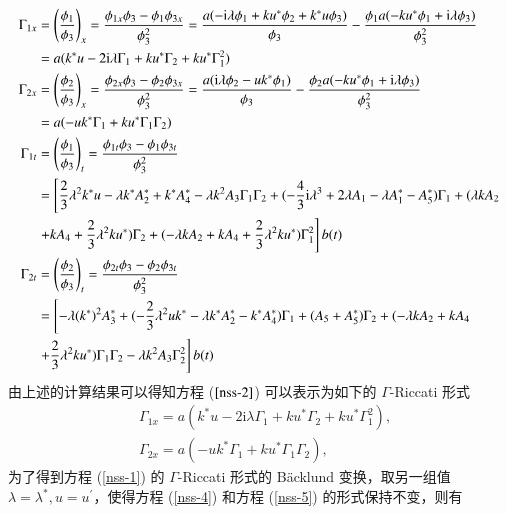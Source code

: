 \begin{align}
\Gamma_{1x} &= \left(\frac{\phi_1}{\phi_3}\right)_x=\frac{\phi_{1x}\phi_3-\phi_1\phi_{3x}}{\phi_3^2}=\frac{a(-\mathrm{i}\lambda\phi_1+ku^*\phi_2+k^*u\phi_3)}{\phi_3}-\frac{\phi_1a(-ku^*\phi_1+\mathrm{i}\lambda\phi_3)}{\phi_3^2} \nonumber\\
  &= a(k^{*}u - 2\mathrm{i}\lambda \Gamma_{1} + ku^{*}\Gamma_{2} + ku^{*}\Gamma_{1}^{2}) \label{nss-g1x} \\
  \Gamma_{2x} &=\left(\frac{\phi_2}{\phi_3}\right)_x=\frac{\phi_{2x}\phi_3-\phi_2\phi_{3x}}{\phi_3^2}=\frac{a(\mathrm{i}\lambda\phi_2-uk^*\phi_1)}{\phi_3}-\frac{\phi_2a(-ku^*\phi_1+\mathrm{i}\lambda\phi_3)}{\phi_3^2}\nonumber\\
  &= a(-uk^{*}\Gamma_{1} + ku^{*}\Gamma_{1}\Gamma_{2}) \label{nss-g2x} \\
  \Gamma_{1t} &= \left(\frac{\phi_1}{\phi_3}\right)_t=\frac{\phi_{1t}\phi_3-\phi_1\phi_{3t}}{\phi_3^2} \notag \\
  &= \left[\frac{2}{3}\lambda^{2}k^{*}u - \lambda k^{*}A_{2}^{*} + k^{*}A_{4}^{*} - \lambda k^{2}A_{3}\Gamma_{1}\Gamma_{2} + (-\frac{4}{3}\mathrm{i}\lambda^{3} + 2\lambda A_{1} - \lambda A_{1}^{*} - A_{5}^{*})\Gamma_{1} + (\lambda kA_{2} \right. \notag\\
  & \left. + kA_{4} + \frac{2}{3}\lambda^{2}ku^{*})\Gamma_{2} + (-\lambda kA_{2} + kA_{4} + \frac{2}{3}\lambda^{2}ku^{*})\Gamma_{1}^{2}\right] b(t)  \label{nss-g1t} \\
  \Gamma_{2t} &=\left(\frac{\phi_2}{\phi_3}\right)_t=\frac{\phi_{2t}\phi_3-\phi_2\phi_{3t}}{\phi_3^2} \notag \\
  &= \left[ -\lambda(k^{*})^{2}A_{3}^{*} + (-\frac{2}{3}\lambda^{2}uk^{*} - \lambda k^{*}A_{2}^{*} - k^{*}A_{4}^{*})\Gamma_{1} + (A_{5}+A_{5}^{*})\Gamma_{2} + (-\lambda kA_{2} +kA_{4} \right. \notag\\
  & \left. + \frac{2}{3}\lambda^{2}ku^{*})\Gamma_{1}\Gamma_{2} - \lambda k^{2}A_{3}\Gamma_{2}^{2} \right] b(t) \label{nss-g2t}
\end{align}
由上述的计算结果可以得知方程 ($\ref{nss-2}$) 可以表示为如下的 $\Gamma$-Riccati 形式
\begin{align}
  & \Gamma_{1x} = a(k^{*}u - 2\mathrm{i}\lambda \Gamma_{1} + ku^{*}\Gamma_{2} + ku^{*}\Gamma_{1}^{2}), \label{nss-4} \\
  & \Gamma_{2x} = a(-uk^{*}\Gamma_{1} + ku^{*}\Gamma_{1}\Gamma_{2}), \label{nss-5}
\end{align}
为了得到方程 (\ref{nss-1}) 的 $\Gamma$-Riccati 形式的 B\"acklund 变换，取另一组值 $\lambda = \lambda^{*}, u = u^{'}$，使得方程 (\ref{nss-4}) 和方程 (\ref{nss-5}) 的形式保持不变，则有
